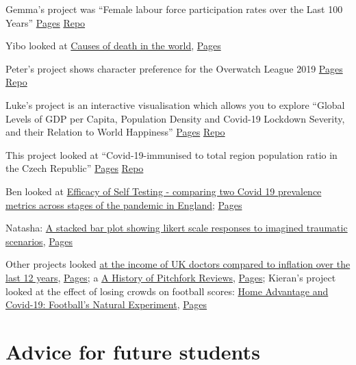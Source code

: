 \documentclass[
]{book}
\begin{document}
Gemma's project was ``Female labour force participation rates over the Last 100 Years''
\href{http://rpubs.com/Gem-Hall/896578}{Pages}
\href{https://github.com/Gem-Hall/PSY6422_project.git}{Repo}

Yibo looked at \href{https://yshi81.github.io/Causes-of-death-in-the-world.github.io/}{Causes of death in the world}, \href{https://github.com/Yshi81/Causes-of-death-in-the-world.github.io}{Pages}

Peter's project shows character preference for the Overwatch League 2019
\href{https://peterbeech.github.io/PSY6422_project/}{Pages}
\href{https://github.com/PeterBeech/PSY6422_project}{Repo}

Luke's project is an interactive visualisation which allows you to explore ``Global Levels of GDP per Capita, Population Density and Covid-19 Lockdown Severity, and their Relation to World Happiness''
\href{https://c6gp2m-luke-jenner.shinyapps.io/PSY6422_Project/}{Pages} \href{https://github.com/lukejenner6/PSY6422_Project}{Repo}

This project looked at ``Covid-19-immunised to total region population ratio in the Czech Republic''
\href{https://yorkshireorange.github.io/PSY6422/}{Pages}
\href{https://github.com/yorkshireorange/PSY6422}{Repo}

Ben looked at \href{https://ben-pw.github.io/PSY6422_Project/}{Efficacy of Self Testing - comparing two Covid 19 prevalence metrics across stages of the pandemic in England}; \href{https://github.com/Ben-PW/PSY6422_Project}{Pages}

Natasha: \href{https://natasharobinson2603.github.io/PSY6422_finalproject/}{A stacked bar plot showing likert scale responses to imagined traumatic scenarios},
\href{https://github.com/NatashaRobinson2603/PSY6422_finalproject}{Pages}

Other projects looked \href{https://hvlabat.shinyapps.io/nhs_income_vs_inflation/}{at the income of UK doctors compared to inflation over the last 12 years}, \href{https://github.com/hvlabat/nhs_income_vs_inflation}{Pages}; a \href{https://meicalowen.github.io/PSY6422-Data-Visualisation/}{A History of Pitchfork Reviews}, \href{https://github.com/meicalowen/PSY6422-Data-Visualisation}{Pages}; Kieran's project looked at the effect of losing crowds on football scores: \href{https://kietag.shinyapps.io/home-advantage-covid-19-app/}{Home Advantage and Covid-19: Football's Natural Experiment}, \href{https://github.com/Kietag/Home-Advantage-Covid-19-App}{Pages}

\hypertarget{advice-for-future-students}{%
\section{Advice for future students}\label{advice-for-future-students}}
\end{document}
